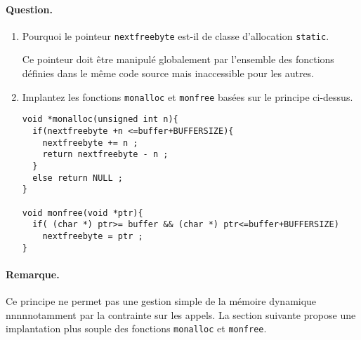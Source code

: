 \paragraph{Question.} 
\begin{enumerate}
\item Pourquoi le pointeur \verb+nextfreebyte+ est-il de classe
  d'allocation \verb+static+.
\ifcorrection
\begin{correction}
  Ce pointeur doit \^etre manipul\'e globalement par l'ensemble des
  fonctions d\'efinies dans le m\^eme code source mais inaccessible
  pour les autres.
\end{correction}
\fi
\item Implantez les fonctions \verb+monalloc+ et \verb+monfree+
  bas\'ees sur le principe ci-dessus.
\ifcorrection
\begin{correction}
\begin{verbatim}
void *monalloc(unsigned int n){
  if(nextfreebyte +n <=buffer+BUFFERSIZE){
    nextfreebyte += n ;
    return nextfreebyte - n ;
  }
  else return NULL ;
}

void monfree(void *ptr){
  if( (char *) ptr>= buffer && (char *) ptr<=buffer+BUFFERSIZE)
    nextfreebyte = ptr ;
}
\end{verbatim}
\end{correction}
\fi
\end{enumerate}

\paragraph{Remarque.} 
Ce principe ne permet pas une gestion simple de la m\'emoire dynamique
nnnnnotamment par la contrainte sur les appels.  La section suivante
propose une implantation plus souple des fonctions \verb+monalloc+ et
\verb+monfree+.

